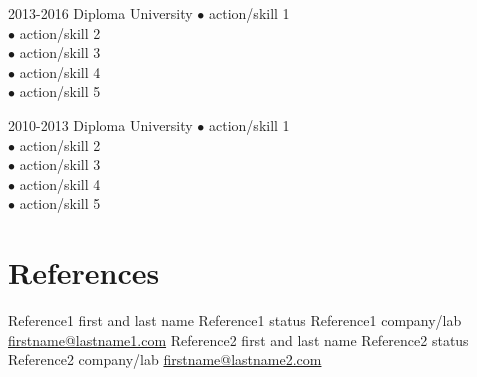 \documentclass[]{friggeri-cv}
\begin{document}
		\begin{entrylist}


			\Education
			{2013-2016}
			{Diploma}
			{University}
			{$\bullet$ action/skill 1\\
			$\bullet$ action/skill 2\\
			$\bullet$ action/skill 3\\
			$\bullet$ action/skill 4\\
			$\bullet$ action/skill 5\\}

			\Education
			{2010-2013}
			{Diploma}
			{University}
			{$\bullet$ action/skill 1\\
			$\bullet$ action/skill 2\\
			$\bullet$ action/skill 3\\
			$\bullet$ action/skill 4\\
			$\bullet$ action/skill 5\\}


		\end{entrylist}


	\section{\faEdit\space References}

		\begin{RefList}

			\Reference
			{Reference1 first and last name}
			{Reference1 status}
			{Reference1 company/lab}
			{\href{mailto:firstname@lastname1.com}{\faInbox\space firstname@lastname1.com}}
			{Reference2 first and last name}
			{Reference2 status}
			{Reference2 company/lab}
			{\href{mailto:firstname@lastname2.com}{\faInbox\space firstname@lastname2.com}}

		\end{RefList}

\end{document}
